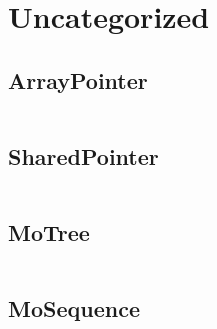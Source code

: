 \section{Uncategorized}
  \subsection{ArrayPointer}
    \inputminted{cpp}{src/8_Uncategorized/1_ArrayPointer.cpp}
  \subsection{SharedPointer}
    \inputminted{cpp}{src/8_Uncategorized/2_SharedPointer.cpp}
  \subsection{MoTree}
    \inputminted{cpp}{src/8_Uncategorized/3_MoTree.cpp}
  \subsection{MoSequence}
    \inputminted{cpp}{src/8_Uncategorized/4_MoSequence.cpp}